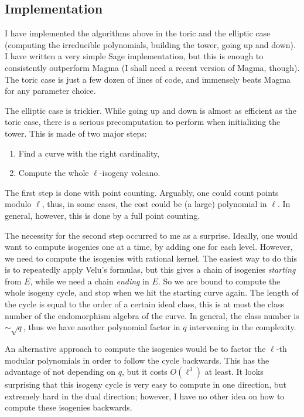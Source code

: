 \documentclass[11pt]{article}
\begin{document}
\subsection{Implementation}
I have implemented the algorithms above in the toric and the elliptic
case (computing the irreducible polynomials, building the tower, going
up and down). I have written a very simple Sage implementation, but
this is enough to consistently outperform Magma (I shall need a recent
version of Magma, though). The toric case is just a few dozen of lines
of code, and immensely beats Magma for any parameter choice. 

The elliptic case is trickier. While going up and down is almost as
efficient as the toric case, there is a serious precomputation to
perform when initializing the tower. This is made of two major steps:

\begin{enumerate}
\item Find a curve with the right cardinality,
\item Compute the whole $\ell$-isogeny volcano.
\end{enumerate}

The first step is done with point counting. Arguably, one could count
points modulo $\ell$, thus, in some cases, the cost could be (a large)
polynomial in $\ell$. In general, however, this is done by a full
point counting.

The necessity for the second step occurred to me as a
surprise. Ideally, one would want to compute isogenies one at a time,
by adding one for each level. However, we need to compute the
isogenies with rational kernel. The easiest way to do this is to
repeatedly apply Velu's formulas, but this gives a chain of isogenies
\emph{starting} from $E$, while we need a chain \emph{ending} in
$E$. So we are bound to compute the whole isogeny cycle, and stop when
we hit the starting curve again. The length of the cycle is equal to
the order of a certain ideal class, this is at most the class number
of the endomorphism algebra of the curve. In general, the class number
is $\sim\sqrt{q}$, thus we have another polynomial factor in $q$
intervening in the complexity.

An alternative approach to compute the isogenies would be to factor
the $\ell$-th modular polynomials in order to follow the cycle
backwards. This has the advantage of not depending on $q$, but it
costs $O(\ell^3)$ at least. It looks surprising that this isogeny
cycle is very easy to compute in one direction, but extremely hard in
the dual direction; however, I have no other idea on how to compute
these isogenies backwards.
\end{document}
